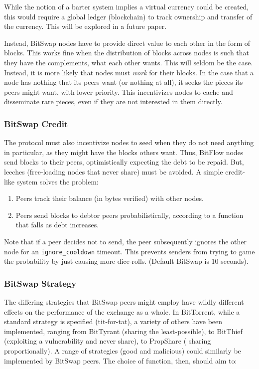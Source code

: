 \documentclass{sig-alternate}
\begin{document}
While the notion of a barter system implies a virtual currency could be
created, this would require a global ledger (blockchain) to track ownership
and transfer of the currency. This will be explored in a future paper.

Instead, BitSwap nodes have to provide direct value to each other
in the form of blocks. This works fine when the distribution of blocks across
nodes is such that they have the complements, what each other wants. This will
seldom be the case. Instead, it is more likely that nodes must \textit{work}
for their blocks. In the case that a node has nothing that its peers want (or
nothing at all), it seeks the pieces its peers might want, with lower
priority. This incentivizes nodes to cache and disseminate rare pieces, even
if they are not interested in them directly.

\subsubsection{BitSwap Credit}

The protocol must also incentivize nodes to seed when they do not need
anything in particular, as they might have the blocks others want. Thus,
BitFlow nodes send blocks to their peers, optimistically expecting the debt to
be repaid. But, leeches (free-loading nodes that never share) must be avoided. A simple credit-like system solves the problem:

\begin{enumerate}
  \item Peers track their balance (in bytes verified) with other nodes.
  \item Peers send blocks to debtor peers probabilistically, according to
        a function that falls as debt increases.
\end{enumerate}

Note that if a peer decides not to send, the peer subsequently ignores the
other node for an \texttt{ignore\_cooldown} timeout. This prevents senders
from trying to game the probability by just causing more dice-rolls.
(Default BitSwap is 10 seconds).

\subsubsection{BitSwap Strategy}

The differing strategies that BitSwap peers might employ have wildly different
effects on the performance of the exchange as a whole. In BitTorrent,
while a standard strategy is specified (tit-for-tat), a variety of others have
been implemented, ranging from BitTyrant (sharing the least-possible),
to BitThief (exploiting a vulnerability and never share), to PropShare (
sharing proportionally). A range of strategies (good and malicious) could
similarly be implemented by BitSwap peers. The choice of function, then, should
aim to:
\end{document}
